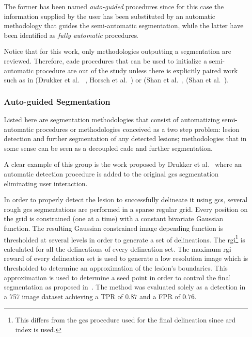 \documentclass[authoryear,preprint,review,12pt]{elsarticle}
\begin{document}
The former has been named \emph{auto-guided} procedures since for this case the information supplied by the user has been substituted by an automatic methodology that guides the semi-automatic segmentation, while the latter have been identified as \emph{fully automatic} procedures.

Notice that for this work, only methodologies outputting a segmentation are reviewed. Therefore, \ac{cade} procedures that can be used to initialize a semi-automatic procedure are out of the study unless there is explicitly paired work such as in (Drukker et al.~\cite{Drukker:2002p10442} , Horsch et al.~\cite{Horsch:2001p6028}) or (Shan et al.~\cite{Shan:2008p10923}, (Shan et al.~\cite{Shan:2012p14347}). 

\subsubsection{Auto-guided Segmentation}
Listed here are segmentation methodologies that consist of automatizing semi-automatic procedures or methodologies  conceived as a two step problem: lesion detection and further segmentation of any detected lesions; methodologies that in some sense can be seen as a decoupled \ac{cade} and further segmentation. 

A clear example of this group is the work proposed by Drukker et al.~\cite{Drukker:2002p10442} where an automatic detection procedure is added to the original \ac{gcs} segmentation~\cite{Horsch:2001p6028} eliminating user interaction.

In order to properly detect the lesion to successfully delineate it using \ac{gcs}, several rough \ac{gcs} segmentations are performed in a sparse regular grid. Every position on the grid is constrained (one at a time) with a constant bivariate Gaussian function. The resulting Gaussian constrained image depending function is thresholded at several levels in order to generate a set of delineations. The \ac{rgi}\footnote{This differs from the \ac{gcs} procedure used for the final delineation since \ac{ard} index is used.} is calculated for all the delineations of every delineation set. The maximum \ac{rgi} reward of every delineation set is used to  generate a low resolution image which is thresholded to determine an approximation of the lesion's boundaries. This approximation is used to determine a seed point in order to control the final segmentation as proposed in~\cite{Horsch:2001p6028}. The method was evaluated solely as a detection in a 757 image dataset achieving a TPR of $0.87$ and a FPR of $0.76$. 
\end{document}

